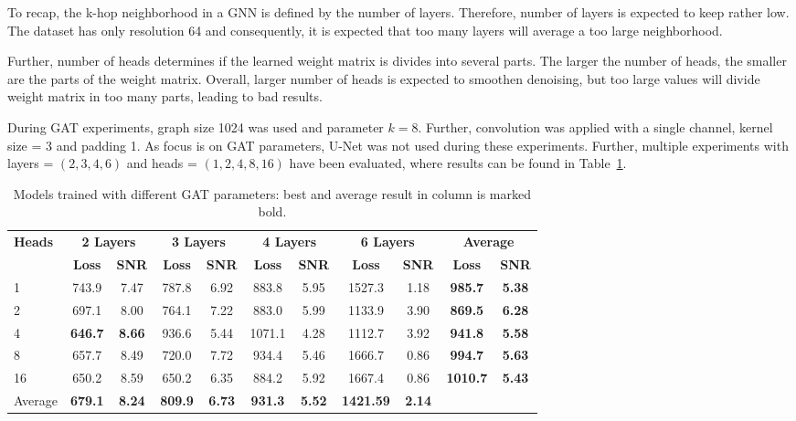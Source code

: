 To recap, the k-hop neighborhood in a GNN is defined by the number of layers.
Therefore, number of layers is expected to keep rather low. The dataset has only resolution 64
and consequently, it is expected that too many layers will average a too large neighborhood.

Further, number of heads determines if the learned weight matrix is divides into several parts.
The larger the number of heads, the smaller are the parts of the weight matrix.
Overall, larger number of heads is expected to smoothen denoising, but too large values
will divide weight matrix in too many parts, leading to bad results.

During GAT experiments, graph size 1024 was used and parameter $k=8$.
Further, convolution was applied with a single channel, kernel size = 3 and padding 1.
As focus is on GAT parameters, U-Net was not used during these experiments.
Further, multiple experiments with layers = $(2,3,4,6)$ and heads = $(1,2,4,8,16)$ have been evaluated, 
where results can be found in Table~\ref{tab:small_gat_results}.

\begin{table}[H]
  \centering
  \begin{tabular}{l|cc|cc|cc|cc|cc}
    \toprule
    \textbf{Heads} & \multicolumn{2}{c|}{\footnotesize \textbf{2 Layers}} & \multicolumn{2}{c|}{\footnotesize \textbf{3 Layers}} & \multicolumn{2}{c|}{\footnotesize \textbf{4 Layers}} & \multicolumn{2}{c|}{\footnotesize \textbf{6 Layers}} & \multicolumn{2}{c}{\footnotesize \textbf{Average}} \\
                   & \textbf{Loss} & \textbf{SNR} & \textbf{Loss} & \textbf{SNR} & \textbf{Loss} & \textbf{SNR} & \textbf{Loss} & \textbf{SNR} & \textbf{Loss} & \textbf{SNR} \\ 
    \midrule
    1    &  743.9           &  7.47            & 787.8  & 6.92   & 883.8     & 5.95  & 1527.3   & 1.18  & \textbf{985.7}  & \textbf{5.38}  \\ \hline
    2    &  697.1           &  8.00            & 764.1  & 7.22   & 883.0     & 5.99  & 1133.9   & 3.90  & \textbf{869.5}  & \textbf{6.28}  \\ \hline
    4    &  \textbf{646.7}  &  \textbf{8.66}   & 936.6  & 5.44   & 1071.1    & 4.28  & 1112.7   & 3.92  & \textbf{941.8}  & \textbf{5.58}  \\ \hline
    8    &  657.7           &  8.49            & 720.0  & 7.72   & 934.4     & 5.46  & 1666.7   & 0.86  & \textbf{994.7}  & \textbf{5.63}  \\ \hline
    16   &  650.2           &  8.59            & 650.2  & 6.35   & 884.2     & 5.92  & 1667.4   & 0.86  & \textbf{1010.7} & \textbf{5.43}  \\ \hline
    
    Average  &  \textbf{679.1}       &  \textbf{8.24}           & \textbf{809.9}  & \textbf{6.73}   & \textbf{931.3}     & \textbf{5.52}  & \textbf{1421.59}   & \textbf{2.14}        \\ 
    \midrule
  \end{tabular}
  \caption{Models trained with different GAT parameters: best and average result in column is marked bold. }
  \label{tab:small_gat_results}
\end{table}


